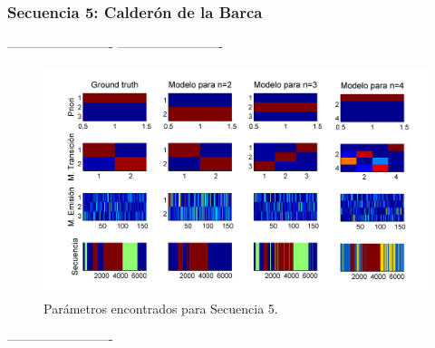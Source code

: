 \newpage
\subsubsection{Secuencia 5: Calderón de la Barca}

-------------------------
-------------------------

\begin{figure}[H]
  \centerline
  {\includegraphics[width=1.3\linewidth]{gfx/chap6/cald1}} \quad
  \caption{Parámetros encontrados para Secuencia 5.}
  \label{fig:prb1_par}
\end{figure}

-------------------------

